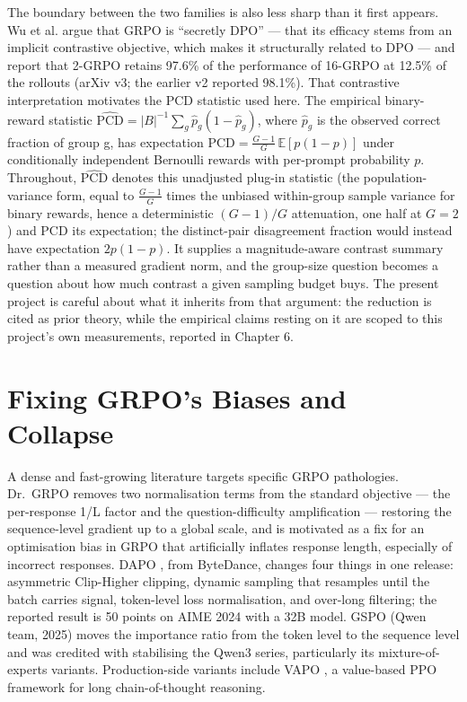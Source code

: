 \documentclass[12pt,a4paper]{report}
\begin{document}
The boundary between the two families is also less sharp than it first
appears. Wu et al. \citep{wu2025ittakestwo} argue that GRPO is
``secretly DPO'' --- that its efficacy stems from an implicit
contrastive objective, which makes it structurally related to DPO ---
and report that 2-GRPO retains 97.6\% of the performance of 16-GRPO at
12.5\% of the rollouts (arXiv v3; the earlier v2 reported 98.1\%). That
contrastive interpretation motivates the PCD statistic used here. The
empirical binary-reward statistic
\(\widehat{\mathrm{PCD}} = |B|^{-1}\sum_g \widehat p_g(1-\widehat p_g)\),
where \(\widehat p_g\) is the observed correct fraction of group g, has
expectation \(\mathrm{PCD} = \frac{G-1}{G}\,\mathbb{E}[p(1-p)]\) under
conditionally independent Bernoulli rewards with per-prompt probability
\(p\). Throughout, \(\widehat{\mathrm{PCD}}\) denotes this unadjusted
plug-in statistic (the population-variance form, equal to
\(\frac{G-1}{G}\) times the unbiased within-group sample variance for
binary rewards, hence a deterministic \((G-1)/G\) attenuation, one half
at \(G=2\)) and PCD its expectation; the distinct-pair disagreement
fraction would instead have expectation \(2p(1-p)\). It supplies a
magnitude-aware contrast summary rather than a measured gradient norm,
and the group-size question becomes a question about how much contrast a
given sampling budget buys. The present project is careful about what it
inherits from that argument: the reduction is cited as prior theory,
while the empirical claims resting on it are scoped to this project's
own measurements, reported in Chapter 6.

\section{Fixing GRPO's Biases and
Collapse}\label{fixing-grpos-biases-and-collapse}

A dense and fast-growing literature targets specific GRPO pathologies.
Dr.~GRPO \citep{liu2025understanding} removes two normalisation terms
from the standard objective --- the per-response 1/L factor and the
question-difficulty amplification --- restoring the sequence-level
gradient up to a global scale, and is motivated as a fix for an
optimisation bias in GRPO that artificially inflates response length,
especially of incorrect responses. DAPO \citep{yu2025dapo}, from
ByteDance, changes four things in one release: asymmetric Clip-Higher
clipping, dynamic sampling that resamples until the batch carries
signal, token-level loss normalisation, and over-long filtering; the
reported result is 50 points on AIME 2024 with a 32B model. GSPO
\citep{zheng2025gspo} (Qwen team, 2025) moves the importance ratio from
the token level to the sequence level and was credited with stabilising
the Qwen3 series, particularly its mixture-of-experts variants.
Production-side variants include VAPO \citep{yue2025vapo}, a value-based
PPO framework for long chain-of-thought reasoning.
\end{document}
